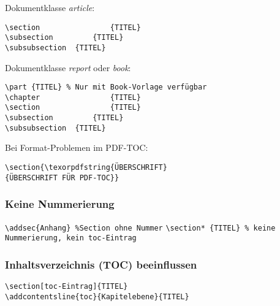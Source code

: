\vspace{-0.5\baselineskip}
Dokumentklasse \emph{article}:
\begin{lstlisting}
\section 				{TITEL}
\subsection 		{TITEL}
\subsubsection 	{TITEL}
\end{lstlisting}

\noindent
Dokumentklasse \emph{report} oder \emph{book}:
\begin{lstlisting}
\part {TITEL} % Nur mit Book-Vorlage verfügbar
\chapter 				{TITEL}
\section 				{TITEL}
\subsection 		{TITEL}
\subsubsection 	{TITEL}
\end{lstlisting}
%
Bei Format-Problemen im PDF-TOC:
\begin{lstlisting}
\section{\texorpdfstring{ÜBERSCHRIFT}
{ÜBERSCHRIFT FÜR PDF-TOC}}
\end{lstlisting}

\negspace\negspace

\subsubsection*{Keine Nummerierung}
\noindent\lstinline|\addsec{Anhang}	%Section ohne Nummer|
\linebreak
\lstinline|\section* {TITEL} % keine Nummerierung, kein toc-Eintrag|

\negspace
\subsubsection*{Inhaltsverzeichnis (TOC) beeinflussen}
\negspace
%
\begin{lstlisting}
\section[toc-Eintrag]{TITEL}
\addcontentsline{toc}{Kapitelebene}{TITEL}
\end{lstlisting}

